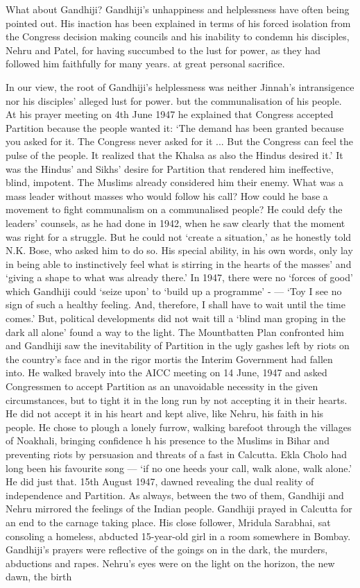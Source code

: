 What about Gandhiji? Gandhiji's unhappiness and helplessness have often being pointed out. His inaction has been explained in terms of his forced isolation from the Congress decision making councils and his inability to condemn his disciples, Nehru and Patel, for having succumbed to the lust for power, as they had followed him faithfully for many years. at great personal sacrifice. 

In our view, the root of Gandhiji's helplessness was neither Jinnah's intransigence nor his disciples' alleged lust for power. but the communalisation of his people. At his prayer meeting on 4th June 1947 he explained that Congress accepted Partition because the people wanted it: `The demand has been granted because you asked for it. The Congress never asked for it ... But the Congress can feel the pulse of the people. It realized that the Khalsa as also the Hindus desired it.' It was the Hindus' and Sikhs' desire for Partition that rendered him ineffective, blind, impotent. The Muslims already considered him their enemy. What was a mass leader without masses who would follow his call? How could he base a movement to fight communalism on a communalised people? He could defy the leaders' counsels, as he had done in 1942, when he saw clearly that the moment was right for a struggle. But he could not `create a situation,' as he honestly told N.K. Bose, who asked him to do so. His special ability, in his own words, only lay in being able to instinctively feel what is stirring in the hearts of the masses' and `giving a shape to what was already there.' In 1947, there were no `forces of good' which Gandhiji could `seize upon' to `build up a programme' - --- `Toy I see no sign of such a healthy feeling. And, therefore, I shall have to wait until the time comes.' But, political developments did not wait till a `blind man groping in the dark all alone' found a way to the light. The Mountbatten Plan confronted him and Gandhiji saw the inevitability of Partition in the ugly gashes left by riots on the country's face and in the rigor mortis the Interim Government had fallen into. He walked bravely into the AICC meeting on 14 June, 1947 and asked Congressmen to accept Partition as an unavoidable necessity in the given circumstances, but to tight it in the long run by not accepting it in their hearts. He did not accept it in his heart and kept alive, like Nehru, his faith in his people. He chose to plough a lonely furrow, walking barefoot through the villages of Noakhali, bringing confidence h his presence to the Muslims in Bihar and preventing riots by persuasion and threats of a fast in Calcutta. Ekla Cholo had long been his favourite song --- `if no one heeds your call, walk alone, walk alone.' He did just that. 15th August 1947, dawned revealing the dual reality of independence and Partition. As always, between the two of them, Gandhiji and Nehru mirrored the feelings of the Indian people. Gandhiji prayed in Calcutta for an end to the carnage taking place. His close follower, Mridula Sarabhai, sat consoling a homeless, abducted 15-year-old girl in a room somewhere in Bombay. Gandhiji's prayers were reflective of the goings on in the dark, the murders, abductions and rapes. Nehru's eyes were on the light on the horizon, the new dawn, the birth 